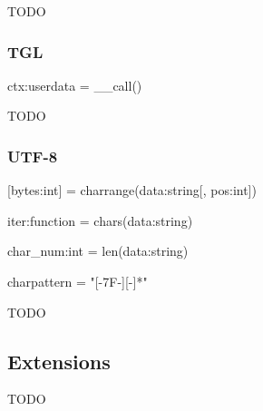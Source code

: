 TODO

\subsubsection{TGL}
\label{sec:tgl}

ctx:userdata = __call()














TODO

\subsubsection{UTF-8}
\label{sec:utf8}

[bytes:int] = charrange(data:string[, pos:int])

iter:function = chars(data:string)

char_num:int = len(data:string)

charpattern = "[\0-\x7F-][-\xBF]*"

TODO

\subsection{Extensions}
\label{sec:extensions}

TODO

